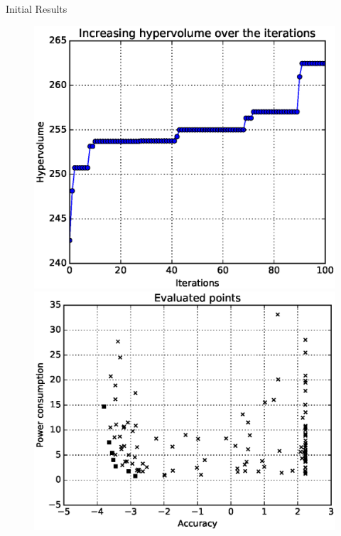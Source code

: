 \documentclass[final]{beamer}
\newlength{\twocolwid}
\begin{document}
\begin{frame}[t]
\begin{columns}[t]
\begin{column}{\twocolwid}
\begin{block}{Initial Results}
\begin{figure}
\centering
\begin{minipage}{.5\textwidth}
  \centering
  \includegraphics[width=\linewidth]{data/curve.eps}
\end{minipage}%
\begin{minipage}{.5\textwidth}
  \centering
  \includegraphics[width=\linewidth]{data/evals.eps}
\end{minipage}
\end{figure}

\end{block}


\end{column}
\end{columns}
\end{frame}
\end{document}
